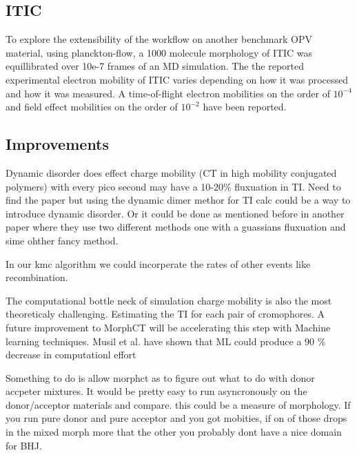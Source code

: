 \subsection{ITIC}
To explore the extensibility of the workflow on another benchmark OPV material, using planckton-flow, a 1000
molecule morphology of ITIC was equillibrated over 10e-7 frames of an MD simulation. The the reported
experimental electron mobility of ITIC varies depending on how it was processed and how it was measured. A
time-of-flight electron mobilities on the order of $10^{-4}$ \cite{Mica2018} and field effect mobilities on the order of
$10^{-2}$ \cite{Park2018} have been reported. 

\subsection{Improvements}
Dynamic disorder does effect charge mobility (CT in high mobility conjugated polymers) with every pico second
may have a 10-20\% fluxuation in TI. Need to find the paper but using the dynamic dimer methor for TI calc
could be a way to introduce dynamic disorder. Or it could be done as mentioned before in another paper where
they use two different methods one with a guassians fluxuation and sime ohther fancy method. 

In our kmc algorithm we could incorperate the rates of other events like recombination.

The computational bottle neck of simulation charge mobility is also the most theoreticaly challenging.
Estimating the TI for each pair of cromophores. A future improvement to MorphCT will be accelerating this step
with Machine learning techniques. Musil et al. have shown that ML could produce a 90 \% decrease in
computationl effort \cite{Musil2018}

Something to do is allow morphct as to figure out what to do with donor accpeter mixtures. It would be pretty
easy to run asyncronously on the donor/acceptor materials and compare. this could be a measure of morphology.
If you run pure donor and pure acceptor and you got mobities, if on of those drops in the mixed morph more
that the other you probably dont have a nice domain for BHJ.

